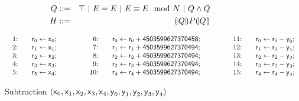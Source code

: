 \begin{eqnarray*}
  Q & ::= & \top
     \ |\   E = E
     \ |\   E \equiv E \mod N
     \ |\   Q \wedge Q\\
  H & ::= & {(\!|}{Q}{|\!)} P {(\!|}{Q}{|\!)}
\end{eqnarray*}


\begin{figure}[ht]
  \centering
  \[
  \begin{array}{lclcl}
    \begin{array}{rcl}
    \textmd{1:} && \dslcode{r}_0 \leftarrow \dslcode{x}_0; \\
    \textmd{2:} && \dslcode{r}_1 \leftarrow \dslcode{x}_1; \\
    \textmd{3:} && \dslcode{r}_2 \leftarrow \dslcode{x}_2; \\
    \textmd{4:} && \dslcode{r}_3 \leftarrow \dslcode{x}_3; \\
    \textmd{5:} && \dslcode{r}_5 \leftarrow \dslcode{x}_4; \\
    \end{array}
    &\hspace{.05\textwidth}&
    \begin{array}{rcl}
    \textmd{6:} && 
      \dslcode{r}_0 \leftarrow \dslcode{r}_0 + \dslcode{4503599627370458}; \\
    \textmd{7:} &&
      \dslcode{r}_1 \leftarrow \dslcode{r}_1 + \dslcode{4503599627370494}; \\
    \textmd{8:} &&
      \dslcode{r}_2 \leftarrow \dslcode{r}_2 + \dslcode{4503599627370494}; \\
    \textmd{9:} &&
      \dslcode{r}_3 \leftarrow \dslcode{r}_3 + \dslcode{4503599627370494}; \\
    \textmd{10:} && 
      \dslcode{r}_4 \leftarrow \dslcode{r}_4 + \dslcode{4503599627370494};\\
    \end{array}
    &\hspace{.05\textwidth}&
    \begin{array}{rcl}
    \textmd{11:} && \dslcode{r}_0 \leftarrow \dslcode{r}_0 - \dslcode{y}_0; \\
    \textmd{12:} && \dslcode{r}_1 \leftarrow \dslcode{r}_1 - \dslcode{y}_1; \\
    \textmd{13:} && \dslcode{r}_2 \leftarrow \dslcode{r}_2 - \dslcode{y}_2; \\
    \textmd{14:} && \dslcode{r}_3 \leftarrow \dslcode{r}_3 - \dslcode{y}_3; \\
    \textmd{15:} && \dslcode{r}_4 \leftarrow \dslcode{r}_4 - \dslcode{y}_4;
    \end{array}
  \end{array}
  \]
  \caption{Subtraction $(\mbox{\textsf{x}}_0, \mbox{\textsf{x}}_1, 
    \mbox{\textsf{x}}_2, \mbox{\textsf{x}}_3, \mbox{\textsf{x}}_4, \mbox{\textsf{y}}_0,
    \mbox{\textsf{y}}_1, \mbox{\textsf{y}}_2, \mbox{\textsf{y}}_3, \mbox{\textsf{y}}_4)$}
  \label{figure:dsl:subtraction}
\end{figure}

